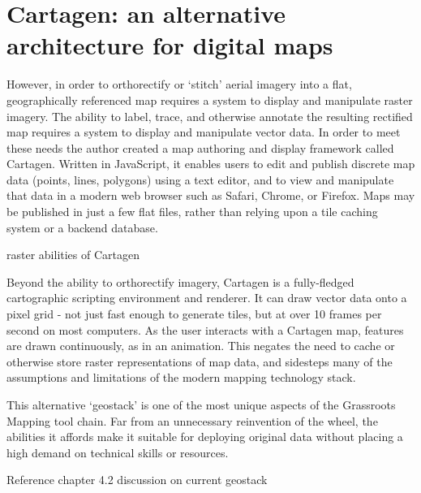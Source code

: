 \documentclass[11pt]{report}
\begin{document}
\section{Cartagen: an alternative architecture for digital maps}

However, in order to orthorectify or `stitch' aerial imagery into a flat, geographically referenced map requires a system to display and manipulate raster imagery. The ability to label, trace, and otherwise annotate the resulting rectified map requires a system to display and manipulate vector data. In order to meet these needs the author created a map authoring and display framework called Cartagen. Written in JavaScript, it enables users to edit and publish discrete map data (points, lines, polygons) using a text editor, and to view and manipulate that data in a modern web browser such as Safari, Chrome, or Firefox. Maps may be published in just a few flat files, rather than relying upon a tile caching system or a backend database.

raster abilities of Cartagen

Beyond the ability to orthorectify imagery, Cartagen is a fully-fledged cartographic scripting environment and renderer. It can draw vector data onto a pixel grid - not just fast enough to generate tiles, but at over 10 frames per second on most computers. As the user interacts with a Cartagen map, features are drawn continuously, as in an animation. This negates the need to cache or otherwise store raster representations of map data, and sidesteps many of the assumptions and limitations of the modern mapping technology stack.

This alternative `geostack' is one of the most unique aspects of the Grassroots Mapping tool chain. Far from an unnecessary reinvention of the wheel, the abilities it affords make it suitable for deploying original data without placing a high demand on technical skills or resources. 

Reference chapter 4.2 discussion on current geostack 

\end{document}
